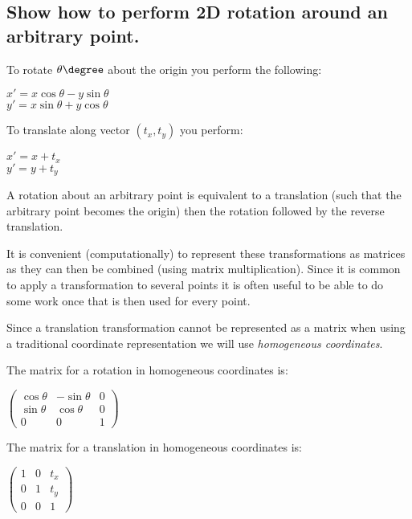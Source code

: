 \documentclass{supervision}
\begin{document}
\begin{questions}
    \question
    \begin{parts}
        \part{Show how to perform 2D rotation around an arbitrary point.}
        \begin{solution}
        To rotate $\theta\degree$ about the origin you perform the following:
        \begin{center}
            $x'=x\cos{\theta}-y\sin{\theta}$ \\
            $y'=x\sin{\theta}+y\cos{\theta}$
        \end{center}
        To translate along vector $(t_x,t_y)$ you perform:
        \begin{center}
            $x'=x+t_x$ \\
            $y'=y+t_y$
        \end{center}
        
        A rotation about an arbitrary point is equivalent to a translation (such that the arbitrary point becomes the origin) then the rotation followed by the reverse translation.
        
        It is convenient (computationally) to represent these transformations as matrices as they can then be combined (using matrix multiplication). Since it is common to apply a transformation to several points it is often useful to be able to do some work once that is then used for every point.
        
        Since a translation transformation cannot be represented as a matrix when using a traditional coordinate representation we will use \textit{homogeneous coordinates}.
        
        The matrix for a rotation in homogeneous coordinates is:
        \begin{center}
            $
            \begin{pmatrix}
            \cos{\theta} & -\sin{\theta} & 0 \\ 
            \sin{\theta} &  \cos{\theta} & 0 \\ 
            0            & 0             & 1
            \end{pmatrix}
            $
        \end{center}
        
        The matrix for a translation in homogeneous coordinates is:
        
        \begin{center}
            $
            \begin{pmatrix}
            1 & 0 & t_x \\ 
            0 & 1 & t_y \\ 
            0 & 0 & 1
            \end{pmatrix}
            $
        \end{center}
        

\end{solution}
\end{parts}
\end{questions}
\end{document}

